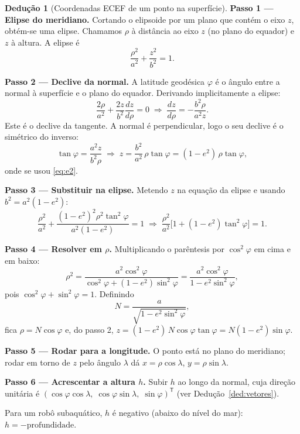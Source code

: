 \documentclass[11pt,a4paper]{article}
\newcommand{\col}[3]{\begin{pmatrix}#1\\#2\\#3\end{pmatrix}}
\newcommand{\T}{^{\mathsf{T}}}
\theoremstyle{definition}
\newtheorem{deducao}{Dedução}[section]
\newcommand{\resultado}[1]{\begin{center}\fbox{\parbox{0.9\textwidth}{\centering #1}}\end{center}}
\begin{document}
\begin{deducao}[Coordenadas ECEF de um ponto na superfície]
\textbf{Passo 1 --- Elipse do meridiano.} Cortando o elipsoide por um plano que contém o eixo $z$, obtém-se uma elipse. Chamamos $\rho$ à distância ao eixo $z$ (no plano do equador) e $z$ à altura. A elipse é
\[
\frac{\rho^2}{a^2}+\frac{z^2}{b^2}=1 .
\]

\textbf{Passo 2 --- Declive da normal.} A latitude geodésica $\varphi$ é o ângulo entre a normal à superfície e o plano do equador. Derivando implicitamente a elipse:
\[
\frac{2\rho}{a^2}+\frac{2z}{b^2}\frac{dz}{d\rho}=0
\;\Longrightarrow\;
\frac{dz}{d\rho}=-\frac{b^2\rho}{a^2 z}.
\]
Este é o declive da tangente. A normal é perpendicular, logo o seu declive é o simétrico do inverso:
\[
\tan\varphi=\frac{a^2 z}{b^2\rho}\;\Longrightarrow\; z=\frac{b^2}{a^2}\,\rho\tan\varphi=(1-e^2)\,\rho\tan\varphi,
\]
onde se usou \eqref{eq:e2}.

\textbf{Passo 3 --- Substituir na elipse.} Metendo $z$ na equação da elipse e usando $b^2=a^2(1-e^2)$:
\[
\frac{\rho^2}{a^2}+\frac{(1-e^2)^2\rho^2\tan^2\varphi}{a^2(1-e^2)}=1
\;\Longrightarrow\;
\frac{\rho^2}{a^2}\Big[1+(1-e^2)\tan^2\varphi\Big]=1 .
\]

\textbf{Passo 4 --- Resolver em $\rho$.} Multiplicando o parêntesis por $\cos^2\varphi$ em cima e em baixo:
\[
\rho^2=\frac{a^2\cos^2\varphi}{\cos^2\varphi+(1-e^2)\sin^2\varphi}
=\frac{a^2\cos^2\varphi}{1-e^2\sin^2\varphi},
\]
pois $\cos^2\varphi+\sin^2\varphi=1$. Definindo
\begin{equation}
N=\frac{a}{\sqrt{1-e^2\sin^2\varphi}},
\label{eq:N}
\end{equation}
fica $\rho=N\cos\varphi$ e, do passo 2, $z=(1-e^2)\,N\cos\varphi\tan\varphi=N(1-e^2)\sin\varphi$.

\textbf{Passo 5 --- Rodar para a longitude.} O ponto está no plano do meridiano; rodar em torno de $z$ pelo ângulo $\lambda$ dá $x=\rho\cos\lambda$, $y=\rho\sin\lambda$.

\textbf{Passo 6 --- Acrescentar a altura $h$.} Subir $h$ ao longo da normal, cuja direção unitária é $(\cos\varphi\cos\lambda,\;\cos\varphi\sin\lambda,\;\sin\varphi)\T$ (ver Dedução~\ref{ded:vetores}).
\end{deducao}

\resultado{$\displaystyle
\col{X}{Y}{Z}_{\text{ECEF}}=
\col{(N+h)\cos\varphi\cos\lambda}{(N+h)\cos\varphi\sin\lambda}{\big(N(1-e^2)+h\big)\sin\varphi}$,\quad
$N=\dfrac{a}{\sqrt{1-e^2\sin^2\varphi}}$}

Para um robô subaquático, $h$ é negativo (abaixo do nível do mar): $h=-\text{profundidade}$.
\end{document}
